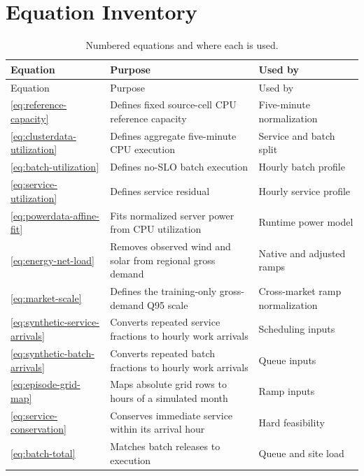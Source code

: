 \documentclass[conference]{IEEEtran}
\begin{document}
\section{Equation Inventory}
\label{app:equation-inventory}

\begingroup
\small
\begin{longtable}{@{}L{0.16\textwidth}L{0.50\textwidth}L{0.26\textwidth}@{}}
  \caption{Numbered equations and where each is used.}
  \label{tab:equation-inventory}\\
  \toprule
  Equation & Purpose & Used by \\
  \midrule
  \endfirsthead
  \toprule
  Equation & Purpose & Used by \\
  \midrule
  \endhead
  \eqref{eq:reference-capacity}
    & Defines fixed source-cell CPU reference capacity
    & Five-minute normalization \\
  \eqref{eq:clusterdata-utilization}
    & Defines aggregate five-minute CPU execution
    & Service and batch split \\
  \eqref{eq:batch-utilization}
    & Defines no-SLO batch execution
    & Hourly batch profile \\
  \eqref{eq:service-utilization}
    & Defines service residual
    & Hourly service profile \\
  \eqref{eq:powerdata-affine-fit}
    & Fits normalized server power from CPU utilization
    & Runtime power model \\
  \eqref{eq:energy-net-load}
    & Removes observed wind and solar from regional gross demand
    & Native and adjusted ramps \\
  \eqref{eq:market-scale}
    & Defines the training-only gross-demand Q95 scale
    & Cross-market ramp normalization \\
  \eqref{eq:synthetic-service-arrivals}
    & Converts repeated service fractions to hourly work arrivals
    & Scheduling inputs \\
  \eqref{eq:synthetic-batch-arrivals}
    & Converts repeated batch fractions to hourly work arrivals
    & Queue inputs \\
  \eqref{eq:episode-grid-map}
    & Maps absolute grid rows to hours of a simulated month
    & Ramp inputs \\
  \eqref{eq:service-conservation}
    & Conserves immediate service within its arrival hour
    & Hard feasibility \\
  \eqref{eq:batch-total}
    & Matches batch releases to execution
    & Queue and site load \\

\end{longtable}
\end{document}
